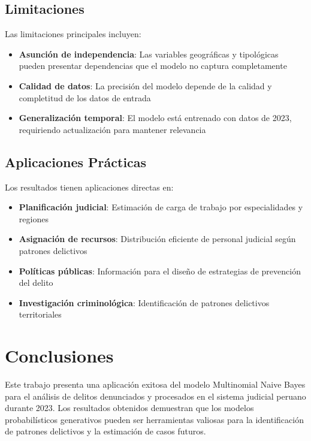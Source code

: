\documentclass[conference]{IEEEtran}
\begin{document}
\subsection{Limitaciones}

Las limitaciones principales incluyen:

\begin{itemize}
\item \textbf{Asunción de independencia}: Las variables geográficas y tipológicas pueden presentar dependencias que el modelo no captura completamente
\item \textbf{Calidad de datos}: La precisión del modelo depende de la calidad y completitud de los datos de entrada
\item \textbf{Generalización temporal}: El modelo está entrenado con datos de 2023, requiriendo actualización para mantener relevancia
\end{itemize}

\subsection{Aplicaciones Prácticas}

Los resultados tienen aplicaciones directas en:

\begin{itemize}
\item \textbf{Planificación judicial}: Estimación de carga de trabajo por especialidades y regiones
\item \textbf{Asignación de recursos}: Distribución eficiente de personal judicial según patrones delictivos
\item \textbf{Políticas públicas}: Información para el diseño de estrategias de prevención del delito
\item \textbf{Investigación criminológica}: Identificación de patrones delictivos territoriales
\end{itemize}

\section{Conclusiones}

Este trabajo presenta una aplicación exitosa del modelo Multinomial Naive Bayes para el análisis de delitos denunciados y procesados en el sistema judicial peruano durante 2023. Los resultados obtenidos demuestran que los modelos probabilísticos generativos pueden ser herramientas valiosas para la identificación de patrones delictivos y la estimación de casos futuros.
\end{document}
